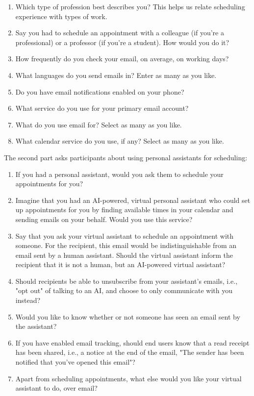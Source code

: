 \documentclass{article}
\begin{document}
\begin{enumerate}
	\item Which type of profession best describes you? This helps us relate scheduling experience with types of work.
	\item Say you had to schedule an appointment with a colleague (if you're a professional) or a professor (if you're a student). How would you do it?
	\item How frequently do you check your email, on average, on working days?
	\item What languages do you send emails in? Enter as many as you like.
	\item Do you have email notifications enabled on your phone?
	\item What service do you use for your primary email account?
	\item What do you use email for? Select as many as you like.
	\item What calendar service do you use, if any? Select as many as you like.
\end{enumerate}

The second part asks participants about using personal assistants for scheduling:

\begin{enumerate}[resume]
	\item If you had a personal assistant, would you ask them to schedule your appointments for you?
	\item Imagine that you had an AI-powered, virtual personal assistant who could set up appointments for you by finding available times in your calendar and sending emails on your behalf. Would you use this service?
	\item Say that you ask your virtual assistant to schedule an appointment with someone. For the recipient, this email would be indistinguishable from an email sent by a human assistant. Should the virtual assistant inform the recipient that it is not a human, but an AI-powered virtual assistant?
	\item Should recipients be able to unsubscribe from your assistant's emails, i.e., "opt out" of talking to an AI, and choose to only communicate with you instead?
	\item Would you like to know whether or not someone has seen an email sent by the assistant?
	\item If you have enabled email tracking, should end users know that a read receipt has been shared, i.e., a notice at the end of the email, "The sender has been notified that you've opened this email"?
	\item Apart from scheduling appointments, what else would you like your virtual assistant to do, over email?
\end{enumerate}
\end{document}
